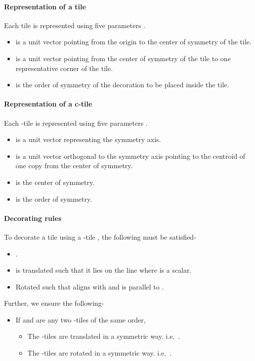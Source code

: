 \documentclass[11pt]{article}
\newcommand{\1}{\mathds{1}}
\begin{document}
\paragraph{Representation of a tile} Each tile is represented using five parameters .
  \begin{itemize}  
    \item  is a unit vector pointing from the origin to the center of symmetry of the tile.
    \item  is a unit vector pointing from the center of symmetry of the tile to one representative corner of the tile.
    \item  is the order of symmetry of the decoration to be placed inside the tile.
  \end{itemize}


\paragraph{Representation of a c-tile} Each -tile is represented using five parameters .
    \begin{itemize}  
      \item  is a unit vector representing the symmetry axis.
      \item  is a unit vector orthogonal to the symmetry axis pointing to the centroid of one copy from the center of symmetry.
      \item  is the center of symmetry.
      \item  is the order of symmetry.
    \end{itemize}

\paragraph{Decorating rules}
To decorate a tile  using a -tile , the following must be satisfied-
\begin{itemize}
 \item .
 \item  is translated such that it lies on the line  where  is a scalar.
 \item Rotated such that  aligns with  and  is parallel to .
\end{itemize}

Further, we ensure the following-
\begin{itemize}
 \item If  and  are any two -tiles of the same order,
   \begin{itemize}
      \item The -tiles are translated in a symmetric way. i.e.\ .
      \item The -tiles are rotated in a symmetric way. i.e.\ .
   \end{itemize}
\end{itemize}
\end{document}
